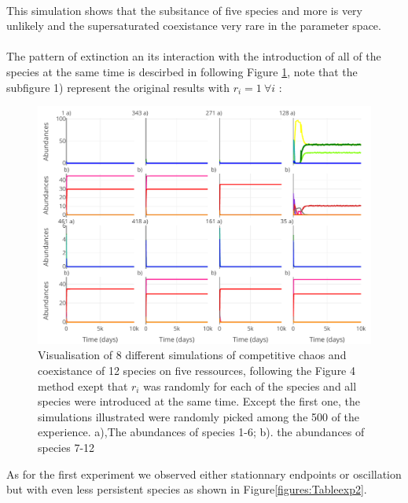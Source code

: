 

\\
This simulation shows that the subsitance of five species and more is very 
unlikely and the supersaturated coexistance very rare in the parameter space.\\
\\
The pattern of extinction an its interaction with the introduction of all of the 
species at the same time is descirbed in following Figure \ref{figures:Figexp2}, 
note that the subfigure 1) represent the original results with $r_i=1 ~\forall 
i$ : 
\begin{figure}[H]
\begin{center} 
 \includegraphics[width=1\textwidth]{../Code/Figures/Figure_exp2.pdf}
  \caption{Visualisation of 8 different simulations of competitive chaos and 
coexistance of 12 species on five ressources, following the Figure 4 method 
exept that $r_i$ was randomly for each of the species and all species were 
introduced at the same time. Except the first one, the simulations illustrated 
were randomly picked among the 500 of the experience. a),The abundances of 
species 1-6; b). the abundances of species 7-12}
  \label{figures:Figexp2}
\end{center}
  \end{figure}
As for the first experiment we observed either stationnary endpoints or 
oscillation but with even less persistent species as shown in 
Figure\ref{figures:Tableexp2}.
